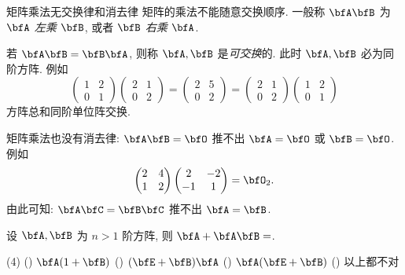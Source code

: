 \begin{frame}{矩阵乘法无交换律和消去律}
	\beqskip{3pt}
	\onslide<+->
	\alert{矩阵的乘法不能随意交换顺序}.
	\onslide<+->
	一般称 $\bfA\bfB$ 为 \emph{$\bfA$ 左乘 $\bfB$}, 或者 \emph{$\bfB$ 右乘 $\bfA$}.

	\onslide<+->
	若 $\bfA\bfB=\bfB\bfA$, 则称 $\bfA,\bfB$ 是\emph{可交换}的.
	\onslide<+->
	此时 $\bfA,\bfB$ \alert{必为同阶方阵}.
	\onslide<+->
	例如
	\[\begin{pmatrix}
		1&2\\0&1
	\end{pmatrix}\begin{pmatrix}
		2&1\\0&2
	\end{pmatrix}=\begin{pmatrix}
		2&5\\0&2
	\end{pmatrix}=\begin{pmatrix}
		2&1\\0&2
	\end{pmatrix}\begin{pmatrix}
		1&2\\0&1
	\end{pmatrix}\]
	\onslide<+->
	方阵总和同阶单位阵交换.

	\onslide<+->
	矩阵乘法也没有消去律: $\bfA\bfB=\bfO$ 推不出 $\bfA=\bfO$ 或 $\bfB=\bfO$.
	\onslide<+->
	例如
	\[\begin{pmatrix}
		2&4\\1&2
	\end{pmatrix}\begin{pmatrix}
		2&-2\\-1&1
	\end{pmatrix}=\bfO_2.\]
	\onslide<+->
	由此可知: $\bfA\bfC=\bfB\bfC$ 推不出 $\bfA=\bfB$. 

	\onslide<+->
	\begin{exercise}
		设 $\bfA,\bfB$ 为 $n>1$ 阶方阵, 则 $\bfA+\bfA\bfB=$.
		\begin{taskschoice}(4)
			() $\bfA(1+\bfB)$
			() $(\bfE+\bfB)\bfA$
			() $\bfA(\bfE+\bfB)$
			() 以上都不对
		\end{taskschoice}
	\end{exercise}
	\endgroup
\end{frame}


